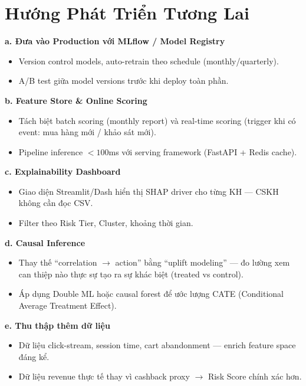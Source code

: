 \documentclass[12pt,a4paper]{article}
\begin{document}
\section{Hướng Phát Triển Tương Lai}

\textbf{a. Đưa vào Production với MLflow / Model Registry}
\begin{itemize}
  \item Version control models, auto-retrain theo schedule (monthly/quarterly).
  \item A/B test giữa model versions trước khi deploy toàn phần.
\end{itemize}

\textbf{b. Feature Store \& Online Scoring}
\begin{itemize}
  \item Tách biệt batch scoring (monthly report) và real-time scoring (trigger khi có event: mua
    hàng mới / khảo sát mới).
  \item Pipeline inference $< 100$ms với serving framework (FastAPI + Redis cache).
\end{itemize}

\textbf{c. Explainability Dashboard}
\begin{itemize}
  \item Giao diện Streamlit/Dash hiển thị SHAP driver cho từng KH --- CSKH không cần đọc CSV.
  \item Filter theo Risk Tier, Cluster, khoảng thời gian.
\end{itemize}

\textbf{d. Causal Inference}
\begin{itemize}
  \item Thay thế ``correlation $\to$ action'' bằng ``uplift modeling'' --- đo lường xem can thiệp
    nào thực sự tạo ra sự khác biệt (treated vs control).
  \item Áp dụng Double ML hoặc causal forest để ước lượng CATE (Conditional Average Treatment
    Effect).
\end{itemize}

\textbf{e. Thu thập thêm dữ liệu}
\begin{itemize}
  \item Dữ liệu click-stream, session time, cart abandonment --- enrich feature space đáng kể.
  \item Dữ liệu revenue thực tế thay vì cashback proxy $\to$ Risk Score chính xác hơn.
\end{itemize}
\end{document}
